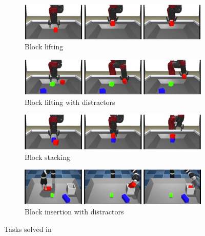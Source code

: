 \begin{figure}[htb]
    \centering
    \begin{subfigure}[b]{0.45\textwidth}
        \includegraphics[width=\textwidth]{Figures/images/trail/block_lifting.jpg}
        \caption{Block lifting}
        \label{fig:block_lifting}
    \end{subfigure}
    \hfill
    \begin{subfigure}[b]{0.45\textwidth}
        \includegraphics[width=\textwidth]{Figures/images/trail/block_lifting_with_distractors.jpg}
        \caption{Block lifting with distractors}
        \label{fig:block_lifting_with_distractors}
    \end{subfigure}
    \hfill
    \begin{subfigure}[b]{0.45\textwidth}
        \includegraphics[width=\textwidth]{Figures/images/trail/block_stacking.jpg}
        \caption{Block stacking}
        \label{fig:block_stacking}
    \end{subfigure}
    \hfill
    \hfill
    \begin{subfigure}[b]{0.45\textwidth}
        \includegraphics[width=\textwidth]{Figures/images/trail/block_insertion_with_distractors.jpg}
        \caption{Block insertion with distractors}
        \label{fig:bloc_insertion_with_distractors}
    \end{subfigure}
    \hfill
 
   \caption{Tasks solved in \cite{zolna2021task_relevant_ail}}
   \label{fig:trail}
\end{figure}

